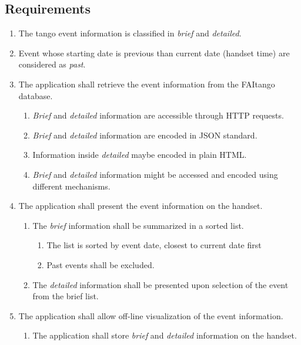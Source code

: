 \documentclass[10pt, twoside]{article}
\begin{document}
\subsection*{Requirements}
\begin{enumerate}
	\item The tango event information is classified 
         		 in \emph{brief} and \emph{detailed}.
	\item Event whose starting date is previous than current date 
          	(handset time) are considered as \emph{past}.
    	\item	The application shall retrieve the event information from the 
          	FAItango database.
    		\begin{enumerate}
        			\item	\emph{Brief} and \emph{detailed} information are accessible through 
              			HTTP requests.
        			\item \emph{Brief} and \emph{detailed} information are encoded in JSON standard.
        			\item Information inside \emph{detailed} maybe encoded in plain HTML.
        			\item \emph{Brief} and \emph{detailed} information might be accessed and encoded using
              			different mechanisms.
    		\end{enumerate}
	\item The application shall present the event information on the handset.
    	\begin{enumerate}
        		\item The \emph{brief} information shall be summarized in a sorted list.
        			\begin{enumerate}
            			\item The list is sorted by event date, closest to current date first
            			\item Past events shall be excluded.
        			\end{enumerate}
        		\item The \emph{detailed} information shall be presented upon selection of
              		the event from the brief list.
    	\end{enumerate}
    	\item The application shall allow off-line visualization of the event information.
    		\begin{enumerate}
        			\item The application shall store \emph{brief} and \emph{detailed} information on the handset.

\end{enumerate}
\end{enumerate}
\end{document}
